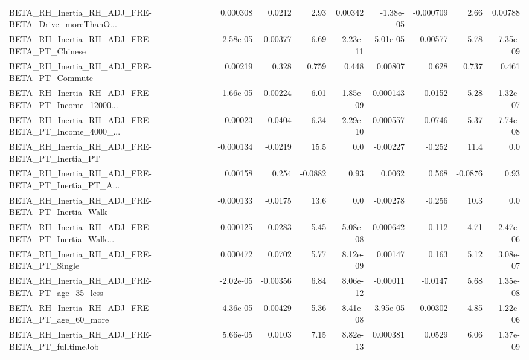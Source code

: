 \begin{tabular}{lrrrrrrrr}
BETA\_RH\_Inertia\_RH\_ADJ\_FRE-BETA\_Drive\_moreThanO... &    0.000308 &       0.0212 &     2.93 &  0.00342 &  -1.38e-05 &   -0.000709 &         2.66 &       0.00788 \\
BETA\_RH\_Inertia\_RH\_ADJ\_FRE-BETA\_PT\_Chinese         &    2.58e-05 &      0.00377 &     6.69 & 2.23e-11 &   5.01e-05 &     0.00577 &         5.78 &      7.35e-09 \\
BETA\_RH\_Inertia\_RH\_ADJ\_FRE-BETA\_PT\_Commute         &     0.00219 &        0.328 &    0.759 &    0.448 &    0.00807 &       0.628 &        0.737 &         0.461 \\
BETA\_RH\_Inertia\_RH\_ADJ\_FRE-BETA\_PT\_Income\_12000... &   -1.66e-05 &     -0.00224 &     6.01 & 1.85e-09 &   0.000143 &      0.0152 &         5.28 &      1.32e-07 \\
BETA\_RH\_Inertia\_RH\_ADJ\_FRE-BETA\_PT\_Income\_4000\_... &     0.00023 &       0.0404 &     6.34 & 2.29e-10 &   0.000557 &      0.0746 &         5.37 &      7.74e-08 \\
BETA\_RH\_Inertia\_RH\_ADJ\_FRE-BETA\_PT\_Inertia\_PT      &   -0.000134 &      -0.0219 &     15.5 &      0.0 &   -0.00227 &      -0.252 &         11.4 &           0.0 \\
BETA\_RH\_Inertia\_RH\_ADJ\_FRE-BETA\_PT\_Inertia\_PT\_A... &     0.00158 &        0.254 &  -0.0882 &     0.93 &     0.0062 &       0.568 &      -0.0876 &          0.93 \\
BETA\_RH\_Inertia\_RH\_ADJ\_FRE-BETA\_PT\_Inertia\_Walk    &   -0.000133 &      -0.0175 &     13.6 &      0.0 &   -0.00278 &      -0.256 &         10.3 &           0.0 \\
BETA\_RH\_Inertia\_RH\_ADJ\_FRE-BETA\_PT\_Inertia\_Walk... &   -0.000125 &      -0.0283 &     5.45 & 5.08e-08 &   0.000642 &       0.112 &         4.71 &      2.47e-06 \\
BETA\_RH\_Inertia\_RH\_ADJ\_FRE-BETA\_PT\_Single          &    0.000472 &       0.0702 &     5.77 & 8.12e-09 &    0.00147 &       0.163 &         5.12 &      3.08e-07 \\
BETA\_RH\_Inertia\_RH\_ADJ\_FRE-BETA\_PT\_age\_35\_less     &   -2.02e-05 &     -0.00356 &     6.84 & 8.06e-12 &   -0.00011 &     -0.0147 &         5.68 &      1.35e-08 \\
BETA\_RH\_Inertia\_RH\_ADJ\_FRE-BETA\_PT\_age\_60\_more     &    4.36e-05 &      0.00429 &     5.36 & 8.41e-08 &   3.95e-05 &     0.00302 &         4.85 &      1.22e-06 \\
BETA\_RH\_Inertia\_RH\_ADJ\_FRE-BETA\_PT\_fulltimeJob     &    5.66e-05 &       0.0103 &     7.15 & 8.82e-13 &   0.000381 &      0.0529 &         6.06 &      1.37e-09 \\

\end{tabular}

